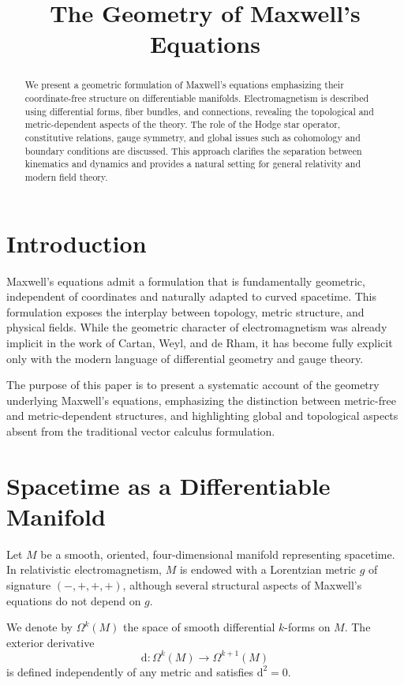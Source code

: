 \documentclass[11pt]{article}
\title{The Geometry of Maxwell's Equations}
\author{}
\date{}
\begin{document}
\maketitle

\begin{abstract}
We present a geometric formulation of Maxwell's equations emphasizing their coordinate-free structure on differentiable manifolds. Electromagnetism is described using differential forms, fiber bundles, and connections, revealing the topological and metric-dependent aspects of the theory. The role of the Hodge star operator, constitutive relations, gauge symmetry, and global issues such as cohomology and boundary conditions are discussed. This approach clarifies the separation between kinematics and dynamics and provides a natural setting for general relativity and modern field theory.
\end{abstract}

\section{Introduction}
Maxwell's equations admit a formulation that is fundamentally geometric, independent of coordinates and naturally adapted to curved spacetime. This formulation exposes the interplay between topology, metric structure, and physical fields. While the geometric character of electromagnetism was already implicit in the work of Cartan, Weyl, and de Rham, it has become fully explicit only with the modern language of differential geometry and gauge theory.

The purpose of this paper is to present a systematic account of the geometry underlying Maxwell's equations, emphasizing the distinction between metric-free and metric-dependent structures, and highlighting global and topological aspects absent from the traditional vector calculus formulation.

\section{Spacetime as a Differentiable Manifold}
Let $M$ be a smooth, oriented, four-dimensional manifold representing spacetime. In relativistic electromagnetism, $M$ is endowed with a Lorentzian metric $g$ of signature $(-,+,+,+)$, although several structural aspects of Maxwell's equations do not depend on $g$.

We denote by $\Omega^k(M)$ the space of smooth differential $k$-forms on $M$. The exterior derivative
\begin{equation}
\mathrm{d}: \Omega^k(M) \to \Omega^{k+1}(M)
\end{equation}
is defined independently of any metric and satisfies $\mathrm{d}^2 = 0$.
\end{document}
